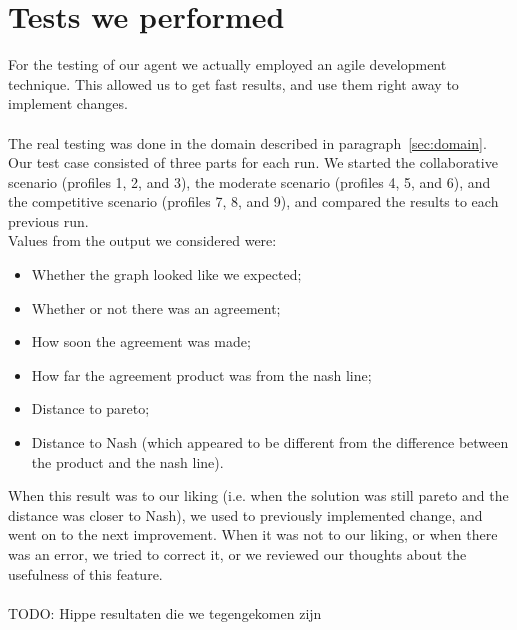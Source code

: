 \section{Tests we performed}
For the testing of our agent we actually employed an agile development technique. This allowed us to get fast results, and use them right away to implement changes.
\\\\
The real testing was done in the domain described in paragraph~\ref{sec:domain}. Our test case consisted of three parts for each run. We started the collaborative scenario (profiles 1, 2, and 3), the moderate scenario (profiles 4, 5, and 6), and the competitive scenario (profiles 7, 8, and 9), and compared the results to each previous run.
\\
Values from the output we considered were:
\begin{itemize}
\item Whether the graph looked like we expected;
\item Whether or not there was an agreement;
\item How soon the agreement was made;
\item How far the agreement product was from the nash line;
\item Distance to pareto;
\item Distance to Nash (which appeared to be different from the difference between the product and the nash line).
\end{itemize}

When this result was to our liking (i.e. when the solution was still pareto and the distance was closer to Nash), we used to previously implemented change, and went on to the next improvement. When it was not to our liking, or when there was an error, we tried to correct it, or we reviewed our thoughts about the usefulness of this feature.
\\\\
TODO: Hippe resultaten die we tegengekomen zijn